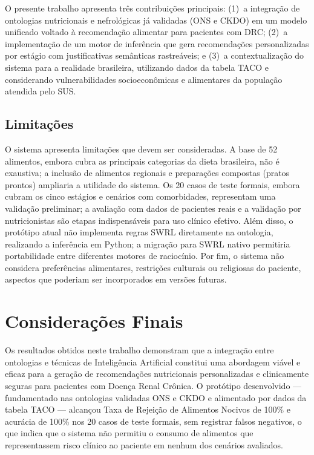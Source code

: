 \documentclass[12pt, a4paper, twocolumn]{article}
\begin{document}
O presente trabalho apresenta três contribuições principais: (1)~a integração de ontologias nutricionais e nefrológicas já validadas (ONS e CKDO) em um modelo unificado voltado à recomendação alimentar para pacientes com DRC; (2)~a implementação de um motor de inferência que gera recomendações personalizadas por estágio com justificativas semânticas rastreáveis; e (3)~a contextualização do sistema para a realidade brasileira, utilizando dados da tabela TACO e considerando vulnerabilidades socioeconômicas e alimentares da população atendida pelo SUS.

    \subsection{Limitações}

O sistema apresenta limitações que devem ser consideradas. A base de 52 alimentos, embora cubra as principais categorias da dieta brasileira, não é exaustiva; a inclusão de alimentos regionais e preparações compostas (pratos prontos) ampliaria a utilidade do sistema. Os 20 casos de teste formais, embora cubram os cinco estágios e cenários com comorbidades, representam uma validação preliminar; a avaliação com dados de pacientes reais e a validação por nutricionistas são etapas indispensáveis para uso clínico efetivo. Além disso, o protótipo atual não implementa regras SWRL diretamente na ontologia, realizando a inferência em Python; a migração para SWRL nativo permitiria portabilidade entre diferentes motores de raciocínio. Por fim, o sistema não considera preferências alimentares, restrições culturais ou religiosas do paciente, aspectos que poderiam ser incorporados em versões futuras.

\section{Considerações Finais}

Os resultados obtidos neste trabalho demonstram que a integração entre ontologias e técnicas de Inteligência Artificial constitui uma abordagem viável e eficaz para a geração de recomendações nutricionais personalizadas e clinicamente seguras para pacientes com Doença Renal Crônica. O protótipo desenvolvido --- fundamentado nas ontologias validadas ONS e CKDO e alimentado por dados da tabela TACO --- alcançou Taxa de Rejeição de Alimentos Nocivos de 100\% e acurácia de 100\% nos 20 casos de teste formais, sem registrar falsos negativos, o que indica que o sistema não permitiu o consumo de alimentos que representassem risco clínico ao paciente em nenhum dos cenários avaliados.
\end{document}
